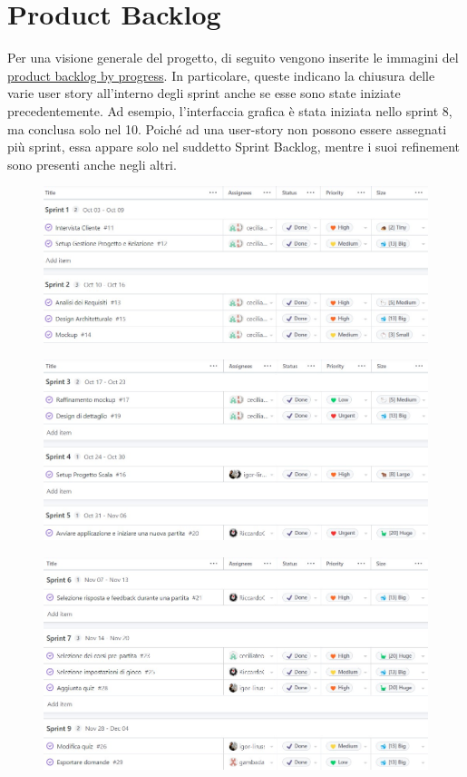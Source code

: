 \chapter{Product Backlog}
Per una visione generale del progetto, di seguito vengono inserite le immagini del \href{https://github.com/orgs/ISIQuiz/projects/3/views/2}{product backlog by progress}. In particolare, queste indicano la chiusura delle varie user story all'interno degli sprint anche se esse sono state iniziate precedentemente. Ad esempio, l'interfaccia grafica è stata iniziata nello sprint 8, ma conclusa solo nel 10. Poiché ad una user-story non possono essere assegnati più sprint, essa appare solo nel suddetto Sprint Backlog, mentre i suoi refinement sono presenti anche negli altri.

\begin{figure}[H]
    \centering
    \includegraphics[width=\textwidth]{process/Img/sprint1_2.jpg}
    \label{fig:Sprint1_2}
\end{figure}
\begin{figure}[H]
    \centering
    \includegraphics[width=\textwidth]{process/Img/sprint3_4_5.jpg}
    \label{fig:Sprint3_4_5}
\end{figure}
\begin{figure}[H]
    \centering
    \includegraphics[width=\textwidth]{process/Img/sprint6_7_9.jpg}
    \label{fig:Sprint6_7_9}
\end{figure}
